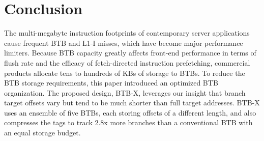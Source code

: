 \section{Conclusion}
\label{cal:sec:conclusion}

The multi-megabyte instruction footprints of contemporary server applications cause frequent BTB and L1-I misses, which have become major performance limiters. Because BTB capacity greatly affects front-end performance in terms of flush rate and the efficacy of fetch-directed instruction prefetching, commercial products allocate tens to hundreds of KBs of storage to BTBs. To reduce the BTB storage requirements, this paper introduced an optimized BTB organization. The proposed design, BTB-X, leverages our insight that branch target offsets vary but tend to be much shorter than full target addresses. BTB-X uses an ensemble of five BTBs, each storing offsets of a different length, and also compresses the tags to track  2.8x more branches than a conventional BTB with an equal storage budget.
